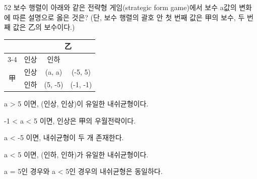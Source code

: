 \begin{question}{52}
보수 행렬이 아래와 같은 전략형 게임(strategic form game)에서 보수 a값의 변화에 따른 설명으로 옳은 것은? (단, 보수 행렬의 괄호 안 첫 번째 값은 甲의 보수, 두 번째 값은 乙의 보수이다.) \par
{\small\centering
\begin{tabular}{|c|c|c|c|}
\hline
\multicolumn{2}{|c|}{} & \multicolumn{2}{c|}{乙} \\ \cline{3-4}
\multicolumn{2}{|c|}{} & 인상 & 인하 \\ \hline
\multirow{2}{*}{甲} & 인상 & (a, a) & (-5, 5) \\ \cline{2-4}
 & 인하 & (5, -5) & (-1, -1) \\ \hline
\end{tabular}\par}
\begin{choices}
  \item a > 5 이면, (인상, 인상)이 유일한 내쉬균형이다.
  \item -1 < a < 5 이면, 인상은 甲의 우월전략이다.
  \item a < -5 이면, 내쉬균형이 두 개 존재한다.
  \item a < 5 이면, (인하, 인하)가 유일한 내쉬균형이다.
  \item a = 5인 경우와 a < 5인 경우의 내쉬균형은 동일하다.
\end{choices}
\end{question}
